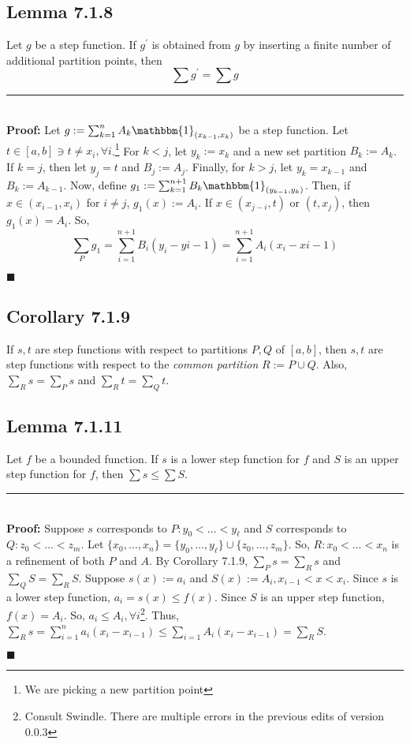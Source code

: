 \documentclass[11pt]{book}
\newcommand{\horline}{\noindent\rule{14.25cm}{0.6pt}\\}
\newcommand{\QED}{\begin{flushright}$\blacksquare$\end{flushright}}
\begin{document}
		\subsection{Lemma 7.1.8}
		\label{subsec:lemm718}
			\begin{lemm}
				Let $g$ be a step function. If $g^{\prime}$ is obtained from $g$ by inserting a finite number of additional partition points, then
				$$\sum g^{\prime} = \sum g$$
				\horline
				\textbf{Proof:} Let $g:= \sum_{k = 1}^n{A_k \mathbbm{1}_{(x_{k-1}, x_k)}}$ be a step function. Let $t \in [a,b] \ni t \neq x_i, \forall i$.\footnote{We are picking 
				a new partition point} For $k < j$, let $y_k := x_k$ and a new set partition $B_k := A_k$. If $k = j$, then let $y_j = t$ and $B_j := A_j$. Finally, for 
				$k > j$, let $y_k = x_{k-1}$ and $B_k := A_{k-1}$. Now, define $g_1 := \sum_{k=1}^{n+1}B_k \mathbbm{1}_{(y_{k-1}, y_k)}$. Then, if $x \in (x_{i-1}, x_i)$ for $i \neq j$, 
				$g_1(x) := A_i$. If $x \in (x_{j - i}, t)$ or $(t, x_j)$, then $g_1(x) = A_i$. So, 
				$$\sum_{P}{g_1} = \sum_{i = 1}^{n+1}{B_i(y_i - y{i-1})} =  \sum_{i = 1}^{n+1}{A_i(x_i - x{i-1})}$$
				\QED
			\end{lemm}

		\subsection{Corollary 7.1.9}
		\label{subsec:cor719}
			\begin{cor}
				If $s,t$ are step functions with respect to partitions $P,Q$ of $[a,b]$, then $s,t$ are step functions with respect to the \emph{common partition} $R := P \cup Q$. 
				Also, $\sum_R s = \sum_P s$ and $\sum_R t = \sum_Q t$.
			\end{cor}

		\subsection{Lemma 7.1.11}
		\label{subsec:lemm7111}
			\begin{lemm}
				Let $f$ be a bounded function. If $s$ is a lower step function for $f$ and $S$ is an upper step function for $f$, then $\sum s \leq \sum S$.\hfill\break
				\horline
				\textbf{Proof:} Suppose $s$ corresponds to $P: y_0 < \dots < y_{\ell}$ and $S$ corresponds to $Q: z_0 < \dots < z_m$. Let $\{x_0, \dots , x_n\} = \{y_0,\dots,y_{\ell}\}
				\cup \{z_0, \dots , z_m\}$. So, $R: x_0 < \dots < x_n$ is a refinement of both $P$ and $A$. By Corollary 7.1.9, $\sum_P s = \sum_R s$ and $\sum_Q S = \sum_R S$.
				Suppose $s(x) := a_i$ and $S(x) := A_i, x_{i-1} < x < x_i$. Since $s$ is a lower step function, $a_i = s(x) \leq f(x)$. Since $S$ is an upper step function,
				$f(x) = A_i$. So, $a_i \leq A_i, \forall i$\footnote{Consult Swindle. There are multiple errors in the previous edits of version 0.0.3}. Thus, 
				$\sum_R s = \sum_{i=1}^n{a_i(x_i - x_{i-1})} \leq \sum_{i=1}{A_i(x_i - x_{i-1})} = \sum_R S$.
				\QED
			\end{lemm}
\newpage
\end{document}
